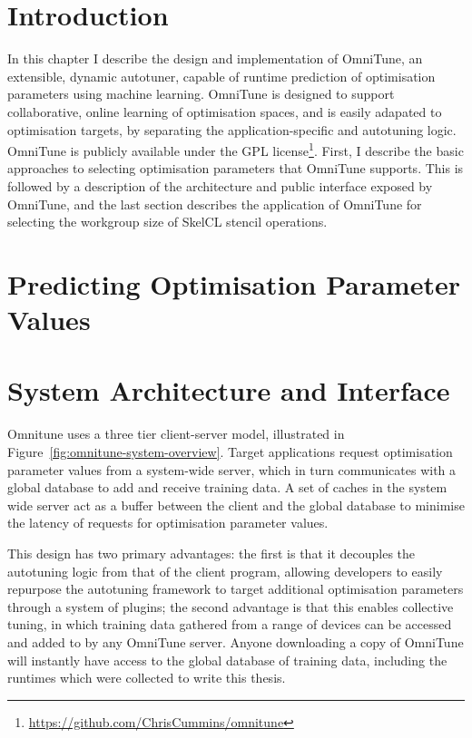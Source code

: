 \section{Introduction}


In this chapter I describe the design and implementation of OmniTune,
an extensible, dynamic autotuner, capable of runtime prediction of
optimisation parameters using machine learning. OmniTune is designed
to support collaborative, online learning of optimisation spaces, and
is easily adapated to optimisation targets, by separating the
application-specific and autotuning logic. OmniTune is publicly
available under the GPL
license\footnote{\url{https://github.com/ChrisCummins/omnitune}}. First,
I describe the basic approaches to selecting optimisation parameters
that OmniTune supports. This is followed by a description of the
architecture and public interface exposed by OmniTune, and the last
section describes the application of OmniTune for selecting the
workgroup size of SkelCL stencil operations.


\section{Predicting Optimisation Parameter Values}


\section{System Architecture and Interface}


Omnitune uses a three tier client-server model, illustrated in
Figure~\ref{fig:omnitune-system-overview}. Target applications request
optimisation parameter values from a system-wide server, which in turn
communicates with a global database to add and receive training
data. A set of caches in the system wide server act as a buffer
between the client and the global database to minimise the latency of
requests for optimisation parameter values.

This design has two primary advantages: the first is that it decouples
the autotuning logic from that of the client program, allowing
developers to easily repurpose the autotuning framework to target
additional optimisation parameters through a system of plugins; the
second advantage is that this enables collective tuning, in which
training data gathered from a range of devices can be accessed and
added to by any OmniTune server. Anyone downloading a copy of OmniTune
will instantly have access to the global database of training data,
including the  runtimes which were collected to
write this thesis.

